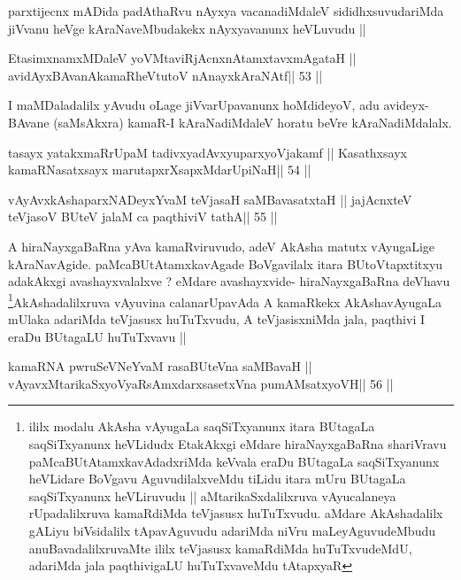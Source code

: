 \begin{artha}
parxtijecnx mADida padAthaRvu nAyxya vacanadiMdaleV sididhxsuvudariMda
jiVvanu heVge kAraNaveMbudakekx nAyxyavanunx heVLuvudu ||
\end{artha}

\begin{shl}
EtasimxnamxMDaleV yoV\s MtaviRjAcnxnAtamxtavxmAgataH ||
avidAyxBAvanAkamaRheVtutoV nAnayxkAraNAtf\hfill || 53 ||
\end{shl}

\begin{artha}
I maMDaladalilx yAvudu oLage jiVvarUpavanunx hoMdideyoV, adu
avideyx-BAvane (saMsAkxra) kamaR-I kAraNadiMdaleV horatu beVre kAraNadiMdalalx.
\end{artha}

\begin{shl}
tasayx yatakxmaRrUpaM tadivxyadAvxyuparxyoVjakamf ||
Kasathxsayx kamaRNasatxsayx marutapxrXsapxMdarUpiNaH\hfill || 54 ||
\end{shl}

\begin{shl}
vAyAvxkAshaparxNADeyxYvaM teVjasaH saMBavasatxtaH ||
jajAcnxteV teVjasoV BUteV jalaM ca paqthiviV tathA\hfill || 55 ||
\end{shl}

\begin{artha}
A hiraNayxgaBaRna yAva kamaRviruvudo, adeV AkAsha matutx vAyugaLige
kAraNavAgide. paMcaBUtAtamxkavAgade BoVgavilalx itara BUtoVtapxtitxyu
adakAkxgi avashayxvalalxve ? eMdare avashayxvide- hiraNayxgaBaRna
deVhavu \footnote{ililx modalu AkAsha vAyugaLa saqSiTxyanunx itara
BUtagaLa saqSiTxyanunx heVLidudx EtakAkxgi eMdare hiraNayxgaBaRna
shariVravu paMcaBUtAtamxkavAdadxriMda keVvala eraDu BUtagaLa
saqSiTxyanunx heVLidare BoVgavu AguvudilalxveMdu tiLidu itara mUru
BUtagaLa saqSiTxyanunx heVLiruvudu || aMtarikaSxdalilxruva
vAyucalaneya rUpadalilxruva kamaRdiMda teVjasusx huTuTxvudu. aMdare
AkAshadalilx gALiyu biVsidalilx tApavAguvudu adariMda niVru
maLeyAguvudeMbudu anuBavadalilxruvaMte ililx teVjasusx kamaRdiMda
huTuTxvudeMdU, adariMda jala paqthivigaLU huTuTxvaveMdu tAtapxyaR}AkAshadalilxruva vAyuvina calanarUpavAda A
kamaRkekx AkAshavAyugaLa mUlaka adariMda teVjasusx huTuTxvudu, A
teVjasisxniMda jala, paqthivi I eraDu BUtagaLU huTuTxvavu ||
\end{artha}

\begin{shl}
kamaRNA pwruSeVNeYvaM rasaBUteVna saMBavaH ||
vAyavxMtarikaSxyoVyaRsAmxdarxsasetxVna pumAMsatxyoVH\hfill || 56 ||
\end{shl}

